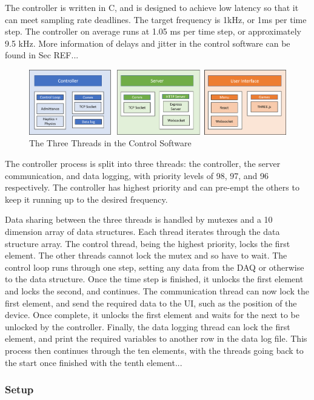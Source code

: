 \documentclass[12pt]{report}
\begin{document}
	The controller is written in C, and is designed to achieve low latency so that it can meet sampling rate deadlines. The target frequency is 1kHz, or 1ms per time step. The controller on average runs at 1.05 ms per time step, or approximately 9.5 kHz. More information of delays and jitter in the control software can be found in Sec REF... 
	
		\begin{figure}[h] 
		\centering
		\includegraphics[width=\linewidth]{software}
		\caption{The Three Threads in the Control Software}
		\label{fig:software}
	\end{figure} 
	
	
	The controller process is split into three threads: the controller, the server communication, and data logging, with priority levels of 98, 97, and 96 respectively. The controller has highest priority and can pre-empt the others to keep it running up to the desired frequency. 
	
	Data sharing between the three threads is handled by mutexes and a 10 dimension array of data structures. Each thread iterates through the data structure array. The control thread, being the highest priority, locks the first element. The other threads cannot lock the mutex and so have to wait. The control loop runs through one step, setting any data from the DAQ or otherwise to the data structure. Once the time step is finished, it unlocks the first element and locks the second, and continues. The communication thread can now lock the first element, and send the required data to the UI, such as the position of the device. Once complete, it unlocks the first element and waits for the next to be unlocked by the controller. Finally, the data logging thread  can lock the first element, and print the required variables to another row in the data log file. This process then continues through the ten elements, with the threads going back to the start once finished with the tenth element...
	
	\subsubsection{Setup}
	
\end{document}
